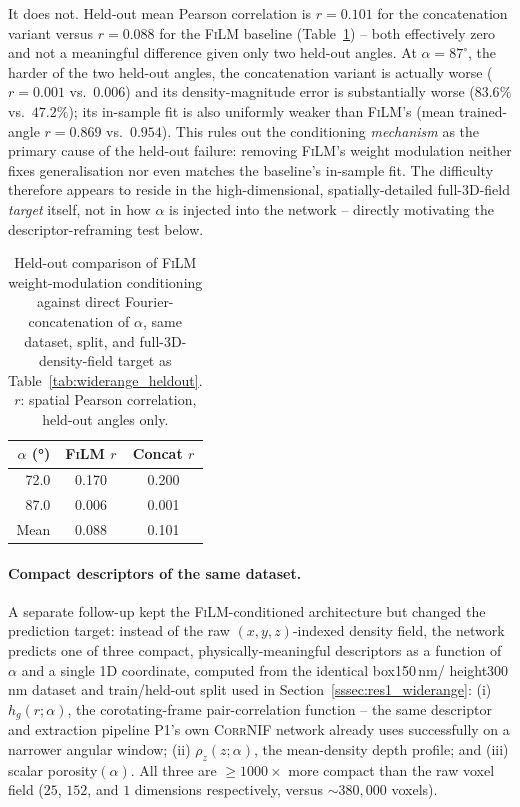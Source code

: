\documentclass[aip,amsmath,amssymb,reprint]{revtex4-1}
\renewcommand{\ang}{\ensuremath{\alpha}} %
\newcommand{\film}{\textsc{FiLM}}
\begin{document}
It does not. Held-out mean Pearson correlation is
$r=0.101$ for the concatenation variant versus $r=0.088$ for the
\film{} baseline (Table~\ref{tab:concat_heldout}) -- both effectively
zero and not a meaningful difference given only two held-out angles.
At $\ang=87^{\circ}$, the harder of the two held-out angles, the
concatenation variant is actually worse ($r=0.001$ vs.\ $0.006$) and
its density-magnitude error is substantially worse ($83.6\%$ vs.\
$47.2\%$); its in-sample fit is also uniformly weaker than \film{}'s
(mean trained-angle $r=0.869$ vs.\ $0.954$). This rules out the
conditioning \emph{mechanism} as the primary cause of the held-out
failure: removing \film{}'s weight modulation neither fixes
generalisation nor even matches the baseline's in-sample fit. The
difficulty therefore appears to reside in the high-dimensional,
spatially-detailed full-3D-field \emph{target} itself, not in how
$\alpha$ is injected into the network -- directly motivating the
descriptor-reframing test below.

\begin{table}[htbp]
  \centering
  \caption{%
    Held-out comparison of \film{} weight-modulation conditioning
    against direct Fourier-concatenation of $\alpha$, same dataset,
    split, and full-3D-density-field target as
    Table~\ref{tab:widerange_heldout}. $r$: spatial Pearson
    correlation, held-out angles only.
  }
  \label{tab:concat_heldout}
  \begin{tabular}{rcc}
    \toprule
    $\ang$ (°) & \film{} $r$ & Concat $r$ \\
    \midrule
    72.0 & 0.170 & 0.200 \\
    87.0 & 0.006 & 0.001 \\
    \midrule
    Mean & 0.088 & 0.101 \\
    \bottomrule
  \end{tabular}
\end{table}

\paragraph{Compact descriptors of the same dataset.}
A separate follow-up kept the \film{}-conditioned architecture but
changed the prediction target: instead of the raw $(x,y,z)$-indexed
density field, the network predicts one of three compact,
physically-meaningful descriptors as a function of $\ang$ and a
single 1D coordinate, computed from the identical box150\,nm/
height300\,nm dataset and train/held-out split used in
Section~\ref{sssec:res1_widerange}: (i) $h_g(r;\ang)$, the
corotating-frame pair-correlation function -- the same descriptor and
extraction pipeline P1's own \textsc{CorrNIF} network already uses
successfully on a narrower angular window; (ii) $\rho_z(z;\ang)$, the
mean-density depth profile; and (iii) scalar porosity$(\ang)$. All
three are $\geq 1000\times$ more compact than the raw voxel field
($25$, $152$, and $1$ dimensions respectively, versus $\sim 380{,}000$
voxels).
\end{document}
